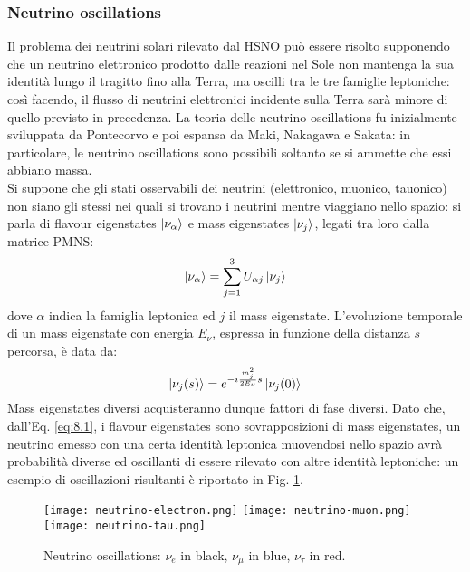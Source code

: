 \subsubsection{Neutrino oscillations}

Il problema dei neutrini solari rilevato dal HSNO può essere risolto supponendo che un neutrino elettronico prodotto dalle reazioni nel Sole non mantenga la sua identità lungo il tragitto fino alla Terra, ma oscilli tra le tre famiglie leptoniche: così facendo, il flusso di neutrini elettronici incidente sulla Terra sarà minore di quello previsto in precedenza. La teoria delle neutrino oscillations fu inizialmente sviluppata da Pontecorvo e poi espansa da Maki, Nakagawa e Sakata: in particolare, le neutrino oscillations sono possibili soltanto se si ammette che essi abbiano massa.\\
Si suppone che gli stati osservabili dei neutrini (elettronico, muonico, tauonico) non siano gli stessi nei quali si trovano i neutrini mentre viaggiano nello spazio: si parla di flavour eigenstates $ \ket{\nu_\alpha} $ e mass eigenstates $ \ket{\nu_j} $, legati tra loro dalla matrice PMNS:
\begin{equation}
	\ket{\nu_{\alpha}} = \sum_{j = 1}^3 U_{\alpha j} \ket{\nu_j}
	\label{eq:8.1}
\end{equation}
dove $ \alpha $ indica la famiglia leptonica ed $ j $ il mass eigenstate. L'evoluzione temporale di un mass eigenstate con energia $ E_{\nu} $, espressa in funzione della distanza $ s $ percorsa, è data da:
\begin{equation}
	\ket{\nu_j(s)} = e^{-i \frac{m_j^2}{2E_{\nu}} s} \ket{\nu_j(0)}
	\label{eq:8.2}
\end{equation}
Mass eigenstates diversi acquisteranno dunque fattori di fase diversi. Dato che, dall'Eq. \ref{eq:8.1}, i flavour eigenstates sono sovrapposizioni di mass eigenstates, un neutrino emesso con una certa identità leptonica muovendosi nello spazio avrà probabilità diverse ed oscillanti di essere rilevato con altre identità leptoniche: un esempio di oscillazioni risultanti è riportato in Fig. \ref{neutrino-oscillations}.

\begin{figure}
	\centering
	\texttt{[image: neutrino-electron.png]}
	\texttt{[image: neutrino-muon.png]}
	\texttt{[image: neutrino-tau.png]}
	\caption{Neutrino oscillations: $ \nu_e $ in black, $ \nu_{\mu} $ in blue, $ \nu_{\tau} $ in red.}
	\label{neutrino-oscillations}
\end{figure}

